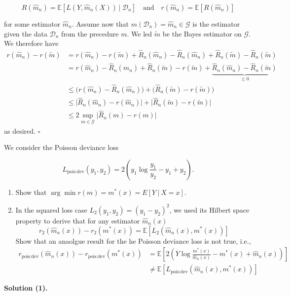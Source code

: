 \documentclass[a4paper,12pt,openany]{book}
\providecommand{\tightlist}{%
 \setlength{\itemsep}{0pt}\setlength{\parskip}{0pt}}
\begin{document}
\[
R(\hat m_n)=\mathbb E[L(Y,\hat m_n(X))\ \vert\ \mathcal D_n]\quad \text{and}\quad r(\hat m_n)=\mathbb E[R(\hat m_n)]
\]

for some estimator \(\hat m_n\). Assume now that \(m(\mathcal D_n)=\hat m_n\in \mathcal G\) is the estimator given the data \(\mathcal D_n\) from the precedure \(m\). We led \(\tilde m\) be the Bayes estimator on \(\mathcal G\). We therefore have
\begin{align*}
r(\hat m_n)-r(\tilde m)&=r(\hat m_n)-r(\tilde m)+\hat R_n(\hat m_n)-\hat R_n(\hat m_n)+\hat R_n(\tilde m)-\hat R_n(\tilde m)\\
&=r(\hat m_n)-\hat R_n(\hat m_n)+\hat R_n(\tilde m)-r(\tilde m)+\underbrace{\hat R_n(\hat m_n)-\hat R_n(\tilde m)}_{\le 0}\\
&\le \Big(r(\hat m_n)-\hat R_n(\hat m_n)\Big)+\Big(\hat R_n(\tilde m)-r(\tilde m)\Big)\\
&\le \Big\vert \hat R_n(\hat m_n)-r(\hat m_n)\Big\vert+\Big\vert \hat R_n(\tilde m)-r(\tilde m)\Big\vert\\
&\le2\sup_{m\in \mathcal G} \Big\vert \hat R_n(m)-r(m)\Big\vert
\end{align*}
as desired. \(\square\)

We consider the Poisson deviance loss

\[
L_{\text{pois:dev}}(y_1,y_2)=2\left(y_1\log \frac{y_1}{y_2}-y_1+y_2\right).
\]

\begin{enumerate}
\def\labelenumi{\arabic{enumi}.}
\tightlist
\item
  Show that \(\arg\min r(m)=m^*(x)=E[Y\ \vert\ X=x]\).
\item
  In the squared loss case \(L_2(y_1,y_2)=(y_1-y_2)^2\), we used its Hilbert space property to derive that for any estimator \(\hat m_n(x)\)
  \[
    r_2(\hat m_n(x))-r_2(m^*(x))=\mathbb E[L_2(\hat m_n(x),m^*(x))]
    \]
  Show that an anaolgue result for the he Poisson deviance loss is not true, i.e.,
  \begin{align*}
    r_{\text{pois:dev}}(\hat m_n(x))-r_{\text{pois:dev}}(m^*(x))&=\mathbb E\left[2\left(Y\log \frac{m^*(x)}{\hat m_n(x)}-m^*(x)+\hat m_n(x)\right)\right]\\
    &\ne \mathbb E[L_{\text{pois:dev}}(\hat m_n(x),m^*(x))]
    \end{align*}
\end{enumerate}

\textbf{Solution (1).}
\end{document}
